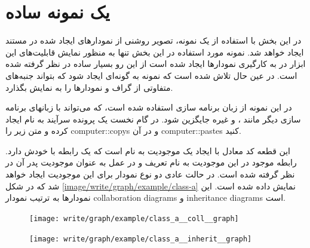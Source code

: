 % 
% 
% 
\section{یک نمونه ساده}

در این بخش با استفاده از یک نمونه، تصویر روشنی از نمودارهای ایجاد شده در مستند
ایجاد خواهد شد. نمونه مورد استفاده در این بخش تنها به منظور نمایش قابلیت‌های این
ابزار در به کارگیری نمودارها ایجاد شده است از این رو بسیار ساده در نظر گرفته شده
است. در عین حال تلاش شده است که نمونه به گونه‌ای ایجاد شود که بتواند جنبه‌های
متفاوتی از گراف و نمودارها را به نمایش بگذارد.


در این نمونه از زبان برنامه سازی  استفاده شده است، که می‌تواند با
زبانهای برنامه سازی دیگر مانند ،  و غیره جایگزین شود. در گام
نخست یک پرونده سرآیند به نام  ایجاد کرده و متن زیر را
\glspl{computer::copy} و در آن \glspl{computer::paste} کنید.


این قطعه کد معادل با ایجاد یک موجودیت به نام  است که یک رابطه با خودش
دارد. رابطه موجود در این موجودیت به نام  تعریف و در
عمل به عنوان موجودیت پدر آن در نظر گرفته شده است. در حالت عادی دو نوع نمودار
برای این موجودیت ایجاد خواهد شد که در شکل \ref{image/write/graph/example/class-a}
نمایش داده شده است. این نمودارها به ترتیب نمودار \glspl{collaboration diagram} و
\glspl{inheritance diagram} است.

\begin{figure}
    \centering
    \texttt{[image: write/graph/example/class\_a\_\_coll\_\_graph]}
    \label{image/write/graph/example/class_a__coll__graph}
\end{figure}

\begin{figure}
    \centering
    \texttt{[image: write/graph/example/class\_a\_\_inherit\_\_graph]}
    \label{image/write/graph/example/class_a__inherit__graph}
\end{figure}

